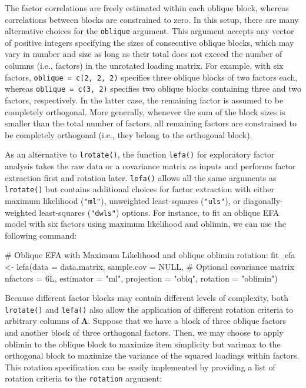 \documentclass[
  12pt,
  letterpaper,
  article]{scrartcl}
\newenvironment{Shaded}{\begin{snugshade}}{\end{snugshade}}
\newcommand{\AttributeTok}[1]{\textcolor[rgb]{0.40,0.45,0.13}{#1}}
\newcommand{\CommentTok}[1]{\textcolor[rgb]{0.37,0.37,0.37}{#1}}
\newcommand{\ConstantTok}[1]{\textcolor[rgb]{0.56,0.35,0.01}{#1}}
\newcommand{\DecValTok}[1]{\textcolor[rgb]{0.68,0.00,0.00}{#1}}
\newcommand{\FunctionTok}[1]{\textcolor[rgb]{0.28,0.35,0.67}{#1}}
\newcommand{\NormalTok}[1]{\textcolor[rgb]{0.00,0.23,0.31}{#1}}
\newcommand{\OtherTok}[1]{\textcolor[rgb]{0.00,0.23,0.31}{#1}}
\newcommand{\StringTok}[1]{\textcolor[rgb]{0.13,0.47,0.30}{#1}}
\begin{document}
The factor correlations are freely estimated within each oblique block,
whereas correlations between blocks are constrained to zero. In this
setup, there are many alternative choices for the \texttt{oblique}
argument. This argument accepts any vector of positive integers
specifying the sizes of consecutive oblique blocks, which may vary in
number and size as long as their total does not exceed the number of
columns (i.e., factors) in the unrotated loading matrix. For example,
with six factors, \texttt{oblique = c(2, 2, 2)} specifies three oblique
blocks of two factors each, whereas \texttt{oblique = c(3, 2)} specifies
two oblique blocks containing three and two factors, respectively. In
the latter case, the remaining factor is assumed to be completely
orthogonal. More generally, whenever the sum of the block sizes is
smaller than the total number of factors, all remaining factors are
constrained to be completely orthogonal (i.e., they belong to the
orthogonal block).

As an alternative to \texttt{lrotate()}, the function \texttt{lefa()}
for exploratory factor analysis takes the raw data or a covariance
matrix as inputs and performs factor extraction first and rotation
later. \texttt{lefa()} allows all the same arguments as
\texttt{lrotate()} but contains additional choices for factor extraction
with either maximum likelihood (\texttt{"ml"}), unweighted least-squares
(\texttt{"uls"}), or diagonally-weighted least-squares (\texttt{"dwls"})
options. For instance, to fit an oblique EFA model with six factors
using maximum likelihood and oblimin, we can use the following command:

\begin{Shaded}
\begin{Highlighting}[]
\CommentTok{\# Oblique EFA with Maximum Likelihood and oblique oblimin rotation:}
\NormalTok{fit\_efa }\OtherTok{\textless{}{-}} \FunctionTok{lefa}\NormalTok{(}\AttributeTok{data =}\NormalTok{ data.matrix,}
                \AttributeTok{sample.cov =} \ConstantTok{NULL}\NormalTok{, }\CommentTok{\# Optional covariance matrix}
                \AttributeTok{nfactors =} \DecValTok{6}\NormalTok{L, }
                \AttributeTok{estimator =} \StringTok{"ml"}\NormalTok{,}
                \AttributeTok{projection =} \StringTok{"oblq"}\NormalTok{,}
                \AttributeTok{rotation =} \StringTok{"oblimin"}\NormalTok{)}
\end{Highlighting}
\end{Shaded}

Because different factor blocks may contain different levels of
complexity, both \texttt{lrotate()} and \texttt{lefa()} also allow the
application of different rotation criteria to arbitrary columns of
\(\mathbf{\Lambda}\). Suppose that we have a block of three oblique
factors and another block of three orthogonal factors. Then, we may
choose to apply oblimin to the oblique block to maximize item simplicity
but varimax to the orthogonal block to maximize the variance of the
squared loadings within factors. This rotation specification can be
easily implemented by providing a list of rotation criteria to the
\texttt{rotation} argument:
\end{document}
